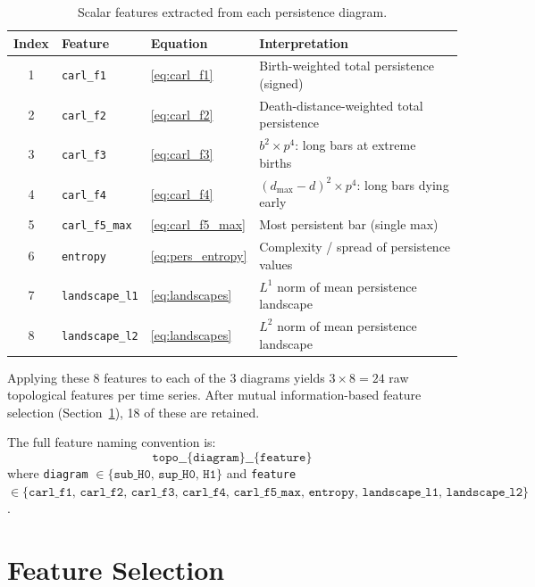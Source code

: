 \documentclass[12pt, a4paper]{article}
\theoremstyle{definition}
\theoremstyle{plain}
\begin{document}
\begin{table}[H]
\centering
\caption{Scalar features extracted from each persistence diagram.}
\label{tab:features_per_diagram}
\begin{tabular}{clll}
\toprule
\textbf{Index} & \textbf{Feature} & \textbf{Equation} & \textbf{Interpretation} \\
\midrule
1 & \texttt{carl\_f1}       & \eqref{eq:carl_f1}      & Birth-weighted total persistence (signed) \\
2 & \texttt{carl\_f2}       & \eqref{eq:carl_f2}      & Death-distance-weighted total persistence \\
3 & \texttt{carl\_f3}       & \eqref{eq:carl_f3}      & $b^2 \times p^4$: long bars at extreme births \\
4 & \texttt{carl\_f4}       & \eqref{eq:carl_f4}      & $(d_{\max}-d)^2 \times p^4$: long bars dying early \\
5 & \texttt{carl\_f5\_max}  & \eqref{eq:carl_f5_max}  & Most persistent bar (single max) \\
6 & \texttt{entropy}        & \eqref{eq:pers_entropy} & Complexity / spread of persistence values \\
7 & \texttt{landscape\_l1}  & \eqref{eq:landscapes}   & $L^1$ norm of mean persistence landscape \\
8 & \texttt{landscape\_l2}  & \eqref{eq:landscapes}   & $L^2$ norm of mean persistence landscape \\
\bottomrule
\end{tabular}
\end{table}

\noindent
Applying these 8 features to each of the 3 diagrams yields $3 \times 8 = 24$ raw
topological features per time series. After mutual information-based feature selection
(Section~\ref{sec:feature_selection}), 18 of these are retained.

The full feature naming convention is:
\[
  \texttt{topo\_\_\{diagram\}\_\_\{feature\}}
\]
where \texttt{diagram} $\in \{\texttt{sub\_H0},\, \texttt{sup\_H0},\, \texttt{H1}\}$
and \texttt{feature} $\in \{\texttt{carl\_f1},\, \texttt{carl\_f2},\, \texttt{carl\_f3},\,
\texttt{carl\_f4},\, \texttt{carl\_f5\_max},\, \texttt{entropy},\,
\texttt{landscape\_l1},\, \texttt{landscape\_l2}\}$.

\section{Feature Selection}
\label{sec:feature_selection}
\end{document}
